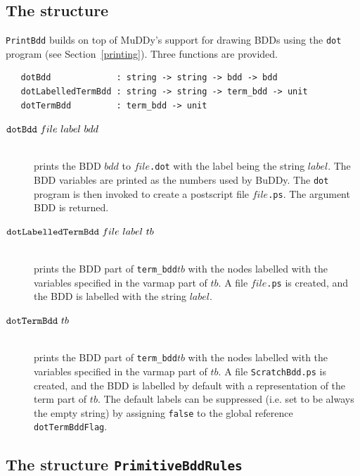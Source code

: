 \documentclass[12pt,fleqn]{article}
\renewcommand{\t}[1]{\mbox{\tt #1}}
\newcommand\termbddty{\texttt{term\_bdd}{}}
\newcommand{\Buddy}{BuDDy{}}
\newcommand{\Muddy}{MuDDy{}}
\begin{document}
\subsection{The structure }\label{PrintBdd}

\t{PrintBdd} builds on top of \Muddy's support for drawing BDDs using the \t{dot}
program (see Section~\ref{printing}). Three functions are provided.

\begin{verbatim}
   dotBdd             : string -> string -> bdd -> bdd
   dotLabelledTermBdd : string -> string -> term_bdd -> unit
   dotTermBdd         : term_bdd -> unit
\end{verbatim}

\begin{description}
\item[$\t{dotBdd}~file~label~bdd$]\mbox{}\\
prints the BDD $bdd$ to $file$\t{.dot} with
the label being the string $label$. The BDD variables are printed as the numbers used by \Buddy{}.
The \t{dot} program is then invoked to create
a postscript file $file$\t{.ps}. The argument BDD is returned.

\item[$\t{dotLabelledTermBdd}~file~label~tb$]\mbox{}\\
prints the
BDD part of \termbddty $tb$ with the nodes labelled with
the variables specified in the varmap part of $tb$. A file $file$\t{.ps}
is created, and the BDD is labelled with the string $label$.


\item[$\t{dotTermBdd}~tb$]\mbox{}\\
prints the
BDD part of \termbddty $tb$ with the nodes labelled with
the variables specified in the varmap part of $tb$. A file \t{ScratchBdd.ps}
is created, and the BDD is labelled by default with a representation
of the term part of $tb$. The default labels
can be suppressed (i.e. set to be always the empty string) by assigning \t{false}
to the global reference \t{dotTermBddFlag}.
\end{description}

\subsection{The structure \t{PrimitiveBddRules}}\label{PrimitiveBddRules}
\end{document}
